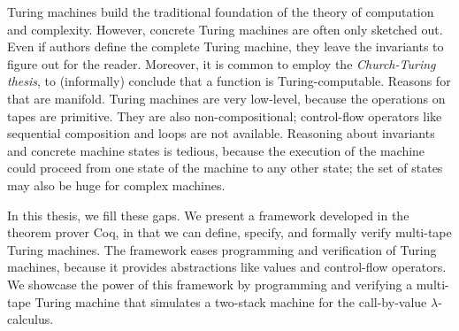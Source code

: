 Turing machines build the traditional foundation of the theory of computation and complexity.  However, concrete Turing machines are often only
sketched out.  Even if authors define the complete Turing machine, they leave the invariants to figure out for the reader.  Moreover, it is common to
employ the \textit{Church-Turing thesis}, to (informally) conclude that a function is Turing-computable.  Reasons for that are manifold.  Turing
machines are very low-level, because the operations on tapes are primitive.  They are also non-compositional; control-flow operators like sequential
composition and loops are not available.  Reasoning about invariants and concrete machine states is tedious, because the execution of the machine
could proceed from one state of the machine to any other state; the set of states may also be huge for complex machines.

In this thesis, we fill these gaps.  We present a framework developed in the theorem prover Coq, in that we can define, specify, and formally verify
multi-tape Turing machines.  The framework eases programming and verification of Turing machines, because it provides abstractions like values and
control-flow operators.  We showcase the power of this framework by programming and verifying a multi-tape Turing machine that simulates a two-stack
machine for the call-by-value $\lambda$-calculus.


